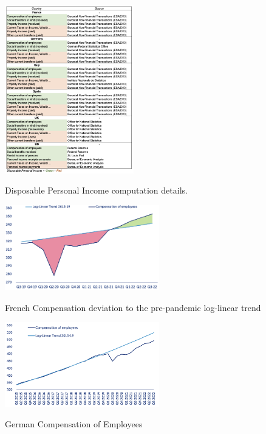 \begin{figure}[H]
    \centering
    \caption{Disposable Personal Income computation details. }
    \includegraphics[width=0.5\textwidth]{Core/1.Savings/img/Ax_savings_table.png}
    \label{figure:DPI_table}
\end{figure}

\begin{figure}[H]
    \centering
    \caption{French Compensation deviation to the pre-pandemic log-linear trend}
    \includegraphics[width=0.6\textwidth]{Core/1.Savings/img/Ax_fr_compensation.png}
    \label{figure:fr_compensation}
\end{figure}

\begin{figure}[H]
    \centering
    \caption{German Compensation of Employees}
    \includegraphics[width=0.6\textwidth]{Core/1.Savings/img/Ax_ger_compensation.png}
    \label{figure:ger_compensation}
\end{figure}

